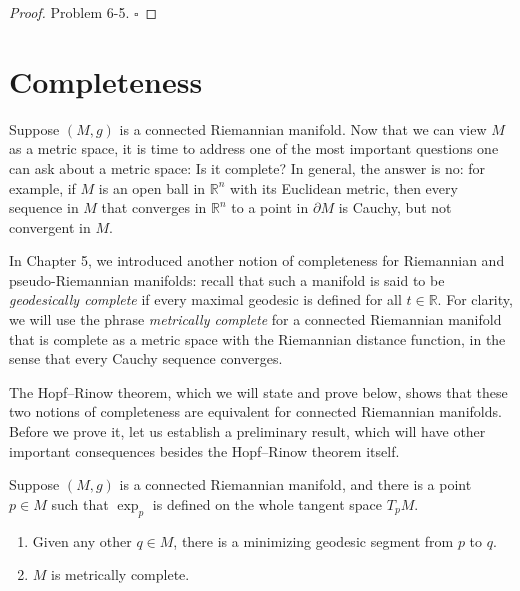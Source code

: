 \begin{proof}
Problem 6-5. $\square$
\end{proof}

\section{Completeness}

Suppose $(M, g)$ is a connected Riemannian manifold. Now that we can view $M$ as a metric space, it is time to address one of the most important questions one can ask about a metric space: Is it complete? In general, the answer is no: for example, if $M$ is an open ball in $\mathbb{R}^n$ with its Euclidean metric, then every sequence in $M$ that converges in $\mathbb{R}^n$ to a point in $\partial M$ is Cauchy, but not convergent in $M$.

In Chapter 5, we introduced another notion of completeness for Riemannian and pseudo-Riemannian manifolds: recall that such a manifold is said to be \emph{geodesically complete} if every maximal geodesic is defined for all $t \in \mathbb{R}$. For clarity, we will use the phrase \emph{metrically complete} for a connected Riemannian manifold that is complete as a metric space with the Riemannian distance function, in the sense that every Cauchy sequence converges.

The Hopf--Rinow theorem, which we will state and prove below, shows that these two notions of completeness are equivalent for connected Riemannian manifolds. Before we prove it, let us establish a preliminary result, which will have other important consequences besides the Hopf--Rinow theorem itself.


\begin{lemma}
\label{lem:exponential-map-implies-completeness}

Suppose $(M,g)$ is a connected Riemannian manifold, and there is a point $p \in M$ such that $\exp_p$ is defined on the whole tangent space $T_p M$.
\begin{enumerate}
\item[(a)] Given any other $q \in M$, there is a minimizing geodesic segment from $p$ to $q$.
\item[(b)] $M$ is metrically complete.
\end{enumerate}
\end{lemma}

